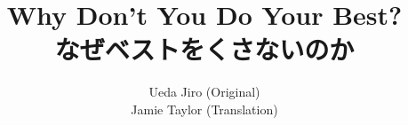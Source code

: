 \documentclass[11pt, a4paper, twoside]{report}
\begin{document}
\begin{CJK}{UTF8}{min}

\title{Why Don't You Do Your Best?\\なぜベストをくさないのか}
\author{Ueda Jiro (Original)\\Jamie Taylor (Translation)}
\maketitle




\tableofcontents




\end{CJK}
\end{document}
